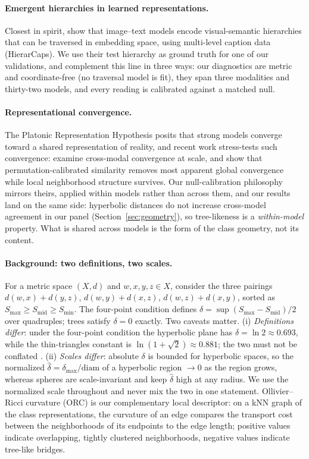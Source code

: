 \documentclass{article} %
\begin{document}
\paragraph{Emergent hierarchies in learned representations.} Closest in spirit, \citet{alper2024hierarcaps} show that image--text models encode visual-semantic hierarchies that can be traversed in embedding space, using multi-level caption data (HierarCaps). We use their test hierarchy as ground truth for one of our validations, and complement this line in three ways: our diagnostics are metric and coordinate-free (no traversal model is fit), they span three modalities and thirty-two models, and every reading is calibrated against a matched null.

\paragraph{Representational convergence.} The Platonic Representation Hypothesis \citep{huh2024platonic} posits that strong models converge toward a shared representation of reality, and recent work stress-tests such convergence: \citet{koepke2026cave} examine cross-modal convergence at scale, and \citet{groger2026aristotelian} show that permutation-calibrated similarity removes most apparent global convergence while local neighborhood structure survives.
Our null-calibration philosophy mirrors theirs, applied within models rather than across them, and our results land on the same side: hyperbolic distances do not increase cross-model agreement in our panel (Section~\ref{sec:geometry}), so tree-likeness is a \emph{within-model} property. What is shared across models is the form of the class geometry, not its content.

\paragraph{Background: two definitions, two scales.} For a metric space $(X,d)$ and $w,x,y,z \in X$, consider the three pairings $d(w,x){+}d(y,z)$, $d(w,y){+}d(x,z)$, $d(w,z){+}d(x,y)$, sorted as $S_{\max} \ge S_{\mathrm{mid}} \ge S_{\min}$. The four-point condition defines $\delta = \sup (S_{\max}-S_{\mathrm{mid}})/2$ over quadruples; trees satisfy $\delta = 0$ exactly. Two caveats matter. (i) \emph{Definitions differ}: under the four-point condition the hyperbolic plane has $\delta = \ln 2 \approx 0.693$, while the thin-triangles constant is $\ln(1+\sqrt{2}) \approx 0.881$; the two must not be conflated \citep{nica2016strong}.
(ii) \emph{Scales differ}: absolute $\delta$ is bounded for hyperbolic spaces, so the normalized $\hat\delta = \delta_{\max}/\mathrm{diam}$ of a hyperbolic region $\to 0$ as the region grows, whereas spheres are scale-invariant and keep $\hat\delta$ high at any radius. We use the normalized scale throughout and never mix the two in one statement. Ollivier--Ricci curvature (ORC) \citep{ollivier2009ricci} is our complementary local descriptor: on a kNN graph of the class representations, the curvature of an edge compares the transport cost between the neighborhoods of its endpoints to the edge length; positive values indicate overlapping, tightly clustered neighborhoods, negative values indicate tree-like bridges.
\end{document}
